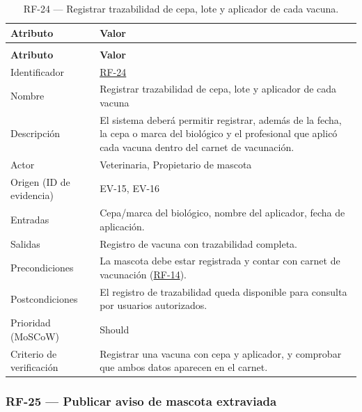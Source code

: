 \documentclass[journal,onecolumn]{IEEEtran}
\makeatletter
\newenvironment{atributos}[2]{%
	\small
	\begin{longtable}{@{}>{\raggedright\arraybackslash}p{4.2cm} >{\raggedright\arraybackslash}p{11.2cm}@{}}
		\caption{#2}\label{tab:#1}\\
		\toprule
		\textbf{Atributo} & \textbf{Valor} \\
		\midrule
		\endfirsthead
		\multicolumn{2}{@{}l}{\small\itshape (continuación)}\\
		\toprule
		\textbf{Atributo} & \textbf{Valor} \\
		\midrule
		\endhead
		\bottomrule
		\endlastfoot
	}{%
	\end{longtable}
	\normalsize
}
\makeatother
\begin{document}
	\begin{atributos}{RF-24}{RF-24 --- Registrar trazabilidad de cepa, lote y aplicador de cada vacuna.}
		Identificador & \hyperref[tab:RF-24]{RF-24} \\
		Nombre & Registrar trazabilidad de cepa, lote y aplicador de cada vacuna \\
		Descripción & El sistema deberá permitir registrar, además de la fecha, la cepa o marca del biológico y el profesional que aplicó cada vacuna dentro del carnet de vacunación. \\
		Actor & Veterinaria, Propietario de mascota \\
		Origen (ID de evidencia) & EV-15, EV-16 \\
		Entradas & Cepa/marca del biológico, nombre del aplicador, fecha de aplicación. \\
		Salidas & Registro de vacuna con trazabilidad completa. \\
		Precondiciones & La mascota debe estar registrada y contar con carnet de vacunación (\hyperref[tab:RF-14]{RF-14}). \\
		Postcondiciones & El registro de trazabilidad queda disponible para consulta por usuarios autorizados. \\
		Prioridad (MoSCoW) & Should \\
		Criterio de verificación & Registrar una vacuna con cepa y aplicador, y comprobar que ambos datos aparecen en el carnet. \\
	\end{atributos}
	
	\subsubsection{RF-25 --- Publicar aviso de mascota extraviada}
	
\end{document}
